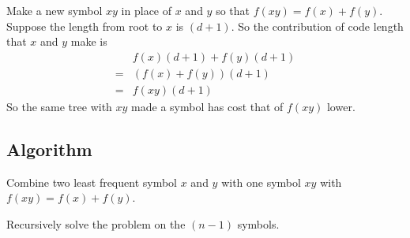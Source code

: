 Make a new symbol $ xy $ in place of $ x $ and $ y $ so that $ f(xy) = f(x) + f(y) $. Suppose the length from root to $x$ is $ (d + 1) $. So the contribution of code length that $x$ and $y$ make is
\begin{align*}
	 & f(x) (d+1) + f(y)(d+1)\\
	=& (f(x) + f(y))(d+1)\\
	=& f(xy)(d+1)
\end{align*}
So the same tree with $xy$ made a symbol has cost that of $ f(xy) $ lower.

\subsection{Algorithm}
Combine two least frequent symbol $ x $ and $ y $ with one symbol $ xy $ with $ f(xy) = f(x) + f(y) $. 

Recursively solve the problem on the $ (n-1) $ symbols.